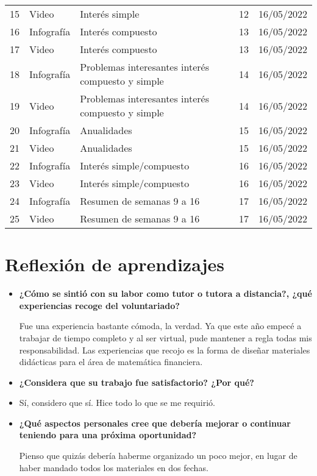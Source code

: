 \documentclass[a4paper, 12pt]{article}
\begin{document}
\begin{table}[H]
{\begin{tabular}{lllll}
    15 & Video      & Interés simple                                    & 12     & 16/05/2022       \\
    16 & Infografía & Interés compuesto                                 & 13     & 16/05/2022       \\
    17 & Video      & Interés compuesto                                 & 13     & 16/05/2022       \\
    18 & Infografía & Problemas interesantes interés compuesto y simple & 14     & 16/05/2022       \\
    19 & Video      & Problemas interesantes interés compuesto y simple & 14     & 16/05/2022       \\
    20 & Infografía & Anualidades                                       & 15     & 16/05/2022       \\
    21 & Video      & Anualidades                                       & 15     & 16/05/2022       \\
    22 & Infografía & Interés simple/compuesto                          & 16     & 16/05/2022       \\
    23 & Video      & Interés simple/compuesto                          & 16     & 16/05/2022       \\
    24 & Infografía & Resumen de semanas 9 a 16                         & 17     & 16/05/2022       \\
    25 & Video      & Resumen de semanas 9 a 16                         & 17     & 16/05/2022      
    \end{tabular}%
    }
    \end{table}

\section{Reflexión de aprendizajes}
\begin{itemize}
    \item \textbf{¿Cómo se sintió con su labor como tutor o tutora a distancia?, ¿qué
    experiencias recoge del voluntariado?}

    Fue una experiencia bastante cómoda, la verdad. Ya que este año empecé a trabajar de tiempo completo y al ser virtual, pude mantener a regla todas mis responsabilidad. Las experiencias que recojo es la forma de diseñar materiales didácticas para el área de matemática financiera. 

    \item \textbf{¿Considera que su trabajo fue satisfactorio? ¿Por qué?}
    \item 
    Sí, considero que sí. Hice todo lo que se me requirió. 
    \item \textbf{¿Qué aspectos personales cree que debería mejorar o continuar teniendo
    para una próxima oportunidad?}

    Pienso que quizás debería haberme organizado un poco mejor, en lugar de haber mandado todos los materiales en dos fechas. 
\end{itemize}
\end{document}
